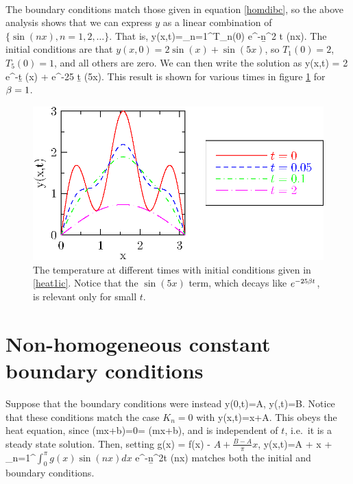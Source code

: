 \documentclass[12pt]{book}
\begin{document}
\\
{
  The boundary conditions match those given in equation \eqref{homdibc}, so
  the above analysis shows that we can express $y$ as a linear combination
  of $\{\sin(nx),n=1,2,\dots\}$. That is,
  \bee
  y(x,t)=\sum_{n=1}^\infty T_n(0) e^{-\b n^2 t} \sin(nx).
  \eee
  The initial conditions are that $y(x,0)=2\sin(x)+\sin(5x)$, so $T_1(0)=2$,
  $T_5(0)=1$, and all others are zero. We can then write the solution as
  \bee
  y(x,t) = 2 e^{-\b t} \sin(x) + e^{-25 \b t} \sin(5x).
  \eee
 This result is shown for various times in figure \ref{heat1} for $\beta=1$.
  \begin{figure}[htbp]
    \begin{center}
      \includegraphics{201/heat1}
      \caption{The temperature at different times with initial conditions
        given in \eqref{heat1ic}. Notice that the $\sin(5x)$ term, which
        decays like $e^{-25 \beta t}$, is relevant only for small $t$. }
      \label{heat1}
    \end{center}
  \end{figure}
}


\section{Non-homogeneous constant boundary conditions}

Suppose that the boundary conditions were instead
\bee
y(0,t)=A, \qquad y(\pi,t)=B.
\eee
Notice that these conditions match the case $K_n=0$ with
\bee
y(x,t)=x+A.
\eee
This obeys the heat equation, since
\bee
{}(mx+b)=0= (mx+b),
\eee
and is independent of $t$, i.e.\ it is a steady state solution. Then, setting
\bee
g(x) = f(x) - \(A+ \frac{B-A}{\pi}x\),
\eee
\be
\label{diribc}
y(x,t)=A + x +
\sum_{n=1}^\infty\(\int_{0}^\pi g(x)\sin(nx)dx\) e^{-\b n^2t} \sin(nx)
\ee
matches both the initial and boundary conditions.
\end{document}
